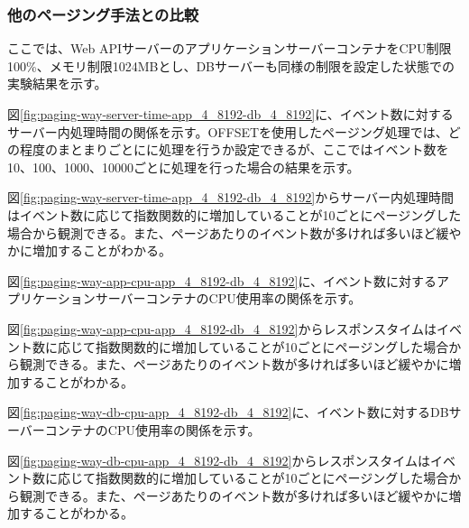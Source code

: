 \documentclass[../../../../main]{subfiles}
\begin{document}
    \subsubsection{他のページング手法との比較}\label{subsubsec:result-paging-way-only-limit}

    ここでは、Web APIサーバーのアプリケーションサーバーコンテナをCPU制限100\%、メモリ制限1024MBとし、DBサーバーも同様の制限を設定した状態での実験結果を示す。

    \label{subsubsubsec:result-paging-way-only-limit-server-time}

    図\ref{fig:paging-way-server-time-app_4_8192-db_4_8192}に、イベント数に対するサーバー内処理時間の関係を示す。OFFSETを使用したページング処理では、どの程度のまとまりごとにに処理を行うか設定できるが、ここではイベント数を10、100、1000、10000ごとに処理を行った場合の結果を示す。

    

    図\ref{fig:paging-way-server-time-app_4_8192-db_4_8192}からサーバー内処理時間はイベント数に応じて指数関数的に増加していることが10ごとにページングした場合から観測できる。また、ページあたりのイベント数が多ければ多いほど緩やかに増加することがわかる。

    \label{subsubsubsec:result-paging-way-only-limit-cpu}

    図\ref{fig:paging-way-app-cpu-app_4_8192-db_4_8192}に、イベント数に対するアプリケーションサーバーコンテナのCPU使用率の関係を示す。

    

    図\ref{fig:paging-way-app-cpu-app_4_8192-db_4_8192}からレスポンスタイムはイベント数に応じて指数関数的に増加していることが10ごとにページングした場合から観測できる。また、ページあたりのイベント数が多ければ多いほど緩やかに増加することがわかる。

    図\ref{fig:paging-way-db-cpu-app_4_8192-db_4_8192}に、イベント数に対するDBサーバーコンテナのCPU使用率の関係を示す。

    

    図\ref{fig:paging-way-db-cpu-app_4_8192-db_4_8192}からレスポンスタイムはイベント数に応じて指数関数的に増加していることが10ごとにページングした場合から観測できる。また、ページあたりのイベント数が多ければ多いほど緩やかに増加することがわかる。
\end{document}
